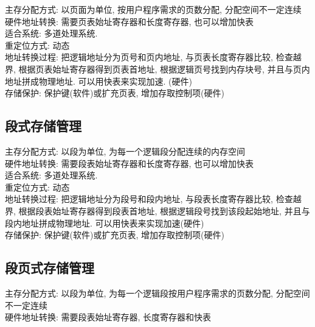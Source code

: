 \documentclass[a4paper, 12pt, notitlepage]{article}
\begin{document}
	主存分配方式: 以页面为单位, 按用户程序需求的页数分配, 分配空间不一定连续 \\
	
	硬件地址转换: 需要页表始址寄存器和长度寄存器, 也可以增加快表 \\
	
	适合系统: 多道处理系统. \\
	
	重定位方式: 动态 \\
	
	地址转换过程: 把逻辑地址分为页号和页内地址, 与页表长度寄存器比较, 检查越界, 根据页表始址寄存器得到页表首地址, 根据逻辑页号找到内存块号, 并且与页内地址拼成物理地址. 可以用快表来实现加速. (硬件) \\
	
	存储保护: 保护键(软件)或扩充页表, 增加存取控制项(硬件) \\

\subsection{段式存储管理}

	主存分配方式: 以段为单位, 为每一个逻辑段分配连续的内存空间 \\
	
	硬件地址转换: 需要段表始址寄存器和长度寄存器, 也可以增加快表 \\
	
	适合系统: 多道处理系统. \\
	
	重定位方式: 动态 \\
	
	地址转换过程: 把逻辑地址分为段号和段内地址, 与段表长度寄存器比较, 检查越界, 根据段表始址寄存器得到段表首地址, 根据逻辑段号找到该段起始地址, 并且与段内地址拼成物理地址. 可以用快表来实现加速(硬件) \\
	
	存储保护: 保护键(软件)或扩充页表, 增加存取控制项(硬件) \\

\subsection{段页式存储管理}

	主存分配方式: 以段为单位, 为每一个逻辑段按用户程序需求的页数分配, 分配空间不一定连续 \\
	
	硬件地址转换: 需要段表始址寄存器, 长度寄存器和快表 \\
	
\end{document}
